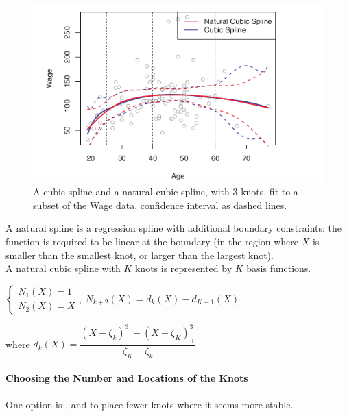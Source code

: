 \begin{figure}[H]
	\begin{center}
		\includegraphics[width=.7\textwidth]{./chap/1chap/6sec/images/1splines.png}
	\end{center}
	\caption{A cubic spline and a natural cubic spline, with 3 
	knots, fit to a subset of the Wage data, confidence interval as
	dashed lines.}
	\label{fig:6.1splines}
\end{figure}
A natural spline is a regression spline with additional boundary 
constraints: the function is required to be linear at the boundary (in
the region where $X$ is smaller than the smallest knot, or larger than
the largest knot).\\
A natural cubic spline with $K$ knots is represented by $K$ basis functions.
\begin{center}
	$\begin{cases}
		N_{1}(X) = 1\\
		N_{2}(X) = X
	\end{cases}
	,~ N_{k+2}(X) = d_{k}(X)-d_{K-1}(X)$
\end{center}
where $d_{k}(X) = \dfrac{\left(X-\zeta_{k}\right)_{+}^{3} - \left(X-\zeta_{K}\right)_{+}^{3}}{
\zeta_{K}-\zeta_{k}}$

\paragraph{Choosing the Number and Locations of the Knots}
One option is , and to place fewer knots where it 
seems more stable.\\

